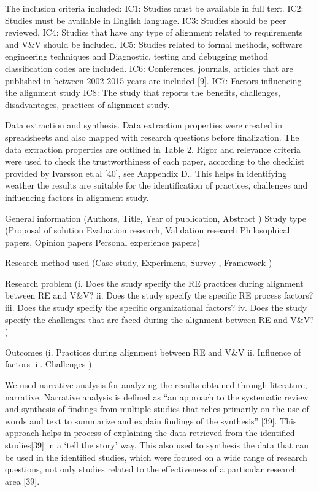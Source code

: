 \documentclass{article}
\begin{document}
The inclusion criteria included:
IC1: Studies must be available in full text.
IC2: Studies must be available in English language.
IC3: Studies should be peer reviewed.
IC4: Studies that have any type of alignment related to requirements and   V&V should be included.
IC5: Studies related to formal methods, software engineering techniques and Diagnostic, testing and debugging method classification codes are included.
IC6: Conferences, journals, articles that are published in between 2002-2015 years are included [9].
IC7: Factors influencing the alignment study
IC8: The study that reports the benefits, challenges, disadvantages, practices of alignment study.

Data extraction and synthesis. Data extraction properties were created in spreadsheets and also mapped with research questions before finalization. The data extraction properties are outlined in Table 2. Rigor and relevance criteria were used to check the trustworthiness of each paper, according to the checklist provided by Ivarsson et.al [40], see Aappendix D.. This helps in identifying weather the results are suitable for the identification of practices, challenges and influencing factors in alignment study.

General information (Authors, Title, Year of publication, Abstract )
Study type (Proposal of solution Evaluation research, Validation research Philosophical papers, Opinion papers
Personal experience papers)

Research method used (Case study,  Experiment,  Survey ,  Framework )

Research problem (i.	Does the study specify the RE practices during alignment between RE and V&V?
ii.	Does the study specify the specific RE process factors?
iii.	Does the study specify the specific organizational factors?
iv.	Does the study specify the challenges that are faced during the alignment between RE and V&V?
)

Outcomes (i.	Practices during alignment between RE and V&V
ii.	Influence of factors
iii.	Challenges
)

We used narrative analysis for analyzing the results obtained through literature, narrative. Narrative analysis is defined as “an approach to the systematic review and synthesis of findings from multiple studies that relies primarily on the use of words and text to summarize and explain findings of the synthesis” [39]. This approach helps in process of explaining the data retrieved from the identified studies[39] in a ‘tell the story’ way. This also used to synthesis the data that can be used in the identified studies, which were focused on a wide range of research questions, not only studies related to the effectiveness of a particular research area [39].
\end{document}
